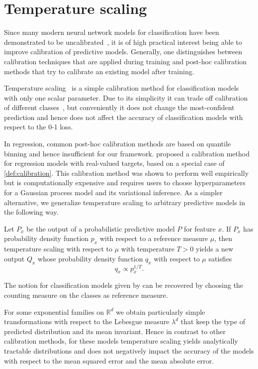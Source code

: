 \documentclass{article}
\begin{document}
\section{Temperature scaling}
\label{app:temperature}

Since many modern neural network models for classification have been
demonstrated to be uncalibrated~\citep{Guo2017}, it is
of high practical interest being able to improve calibration of
predictive models.
Generally, one distinguishes between calibration techniques that are
applied during training and post-hoc calibration methods that try to
calibrate an existing model after training.

Temperature scaling~\citep{Guo2017} is a simple calibration method 
for classification models with only one scalar parameter. Due to its
simplicity it can trade off calibration of different classes~\citep{Kull2019}, but
conveniently it does not change the most-confident prediction and
hence does not affect the accuracy of classification models with
respect to the 0-1 loss.

In regression, common post-hoc calibration methods are
based on quantile binning and hence insufficient for our framework.
\citet{Song2019} proposed a calibration method for regression models
with real-valued targets, based on a special case of \cref{def:calibration}.
This calibration method was shown to perform well empirically but is
computationally expensive and requires users to choose hyperparameters for
a Gaussian process model and its variational inference.
As a simpler alternative, we
generalize temperature scaling to arbitrary predictive models in the
following way.

\begin{definition}\label{def:temperature}
Let $P_x$ be the output of a probabilistic predictive model $P$ 
for feature $x$. If $P_x$ has probability density function $p_x$ with
respect to a reference measure $\mu$, then temperature scaling
with respect to $\mu$ with temperature $T > 0$ yields a new output
$Q_x$ whose probability density function $q_x$ with respect to $\mu$
satisfies
\begin{equation*}
    q_x \propto p_x^{1/T}.
\end{equation*}
\end{definition}

The notion for classification models given by \citet{Guo2017} can be
recovered by choosing the counting measure on the classes as reference
measure.

For some exponential families on $\mathbb{R}^d$ we obtain
particularly simple transformations with respect to the
Lebesgue measure $\lambda^d$ that keep the type of predicted
distribution and its mean invariant. Hence in contrast
to other calibration methods, for these models temperature
scaling yields analytically tractable distributions and does
not negatively impact the accuracy of the models with
respect to the mean squared error and the mean absolute
error.
\end{document}
